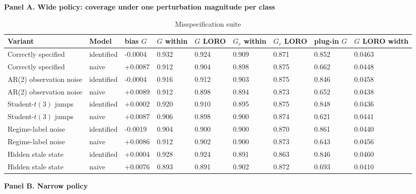 \begin{table}[!htbp]
\centering
\scriptsize
\caption{Misspecification suite}
\label{tab:b4}
\vspace{0.5em}
\par\textbf{Panel A. Wide policy: coverage under one perturbation magnitude per class}

\begin{adjustbox}{max width=\linewidth}
\begin{tabular}{@{}lllllllll@{}}
\toprule
Variant & Model & bias $G$ & $G$ within & $G$ LORO & $G_r$ within & $G_r$ LORO & plug-in $G$ & $G$ LORO width \\
\midrule
Correctly specified & identified & -0.0004 & 0.932 & 0.924 & 0.909 & 0.871 & 0.852 & 0.0463 \\
Correctly specified & naive & +0.0087 & 0.912 & 0.904 & 0.898 & 0.875 & 0.662 & 0.0448 \\
AR(2) observation noise & identified & -0.0004 & 0.916 & 0.912 & 0.903 & 0.875 & 0.846 & 0.0458 \\
AR(2) observation noise & naive & +0.0089 & 0.912 & 0.898 & 0.894 & 0.873 & 0.652 & 0.0438 \\
Student-$t(3)$ jumps & identified & +0.0002 & 0.920 & 0.910 & 0.895 & 0.875 & 0.848 & 0.0436 \\
Student-$t(3)$ jumps & naive & +0.0087 & 0.906 & 0.898 & 0.900 & 0.874 & 0.621 & 0.0441 \\
Regime-label noise & identified & -0.0019 & 0.904 & 0.900 & 0.900 & 0.870 & 0.861 & 0.0440 \\
Regime-label noise & naive & +0.0086 & 0.912 & 0.902 & 0.900 & 0.873 & 0.643 & 0.0456 \\
Hidden stale state & identified & +0.0004 & 0.928 & 0.924 & 0.891 & 0.863 & 0.846 & 0.0460 \\
Hidden stale state & naive & +0.0076 & 0.893 & 0.891 & 0.902 & 0.872 & 0.693 & 0.0410 \\
\bottomrule
\end{tabular}
\end{adjustbox}
\vspace{0.5em}
\par\textbf{Panel B. Narrow policy}


\end{table}
